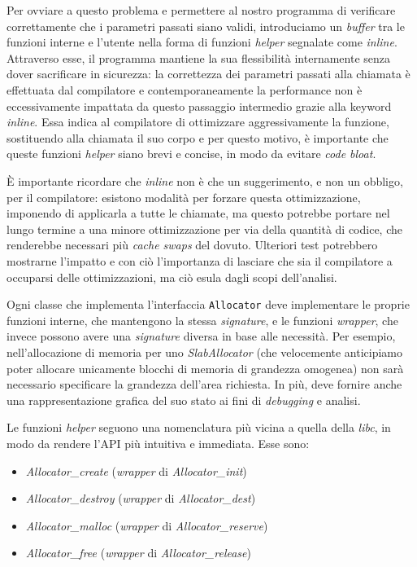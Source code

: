 \documentclass[noexaminfo]{sapthesis}
\begin{document}
Per ovviare a questo problema e permettere al nostro programma di verificare correttamente che i parametri passati siano validi, introduciamo un \textit{buffer} tra le funzioni interne e l’utente nella forma di funzioni \textit{helper} segnalate come \textit{inline}. Attraverso esse, il programma mantiene la sua flessibilità internamente senza dover sacrificare in sicurezza: la correttezza dei parametri passati alla chiamata è effettuata dal compilatore e contemporaneamente la performance non è eccessivamente impattata da questo passaggio intermedio grazie alla keyword \textit{inline}. Essa indica al compilatore di ottimizzare aggressivamente la funzione, sostituendo alla chiamata il suo corpo e per questo motivo, è importante che queste funzioni \textit{helper} siano brevi e concise, in modo da evitare \textit{code bloat}.

È importante ricordare che \textit{inline} non è che un suggerimento, e non un obbligo, per il compilatore: esistono modalità per forzare questa ottimizzazione, imponendo di applicarla a tutte le chiamate, ma questo potrebbe portare nel lungo termine a una minore ottimizzazione per via della quantità di codice, che renderebbe necessari più \textit{cache swaps} del dovuto. Ulteriori test potrebbero mostrarne l’impatto e con ciò l’importanza di lasciare che sia il compilatore a occuparsi delle ottimizzazioni, ma ciò esula dagli scopi dell’analisi.

Ogni classe che implementa l’interfaccia \texttt{Allocator} deve implementare le proprie funzioni interne, che mantengono la stessa \textit{signature}, e le funzioni \textit{wrapper}, che invece possono avere una \textit{signature} diversa in base alle necessità. Per esempio, nell’allocazione di memoria per uno \textit{SlabAllocator} (che velocemente anticipiamo poter allocare unicamente blocchi di memoria di grandezza omogenea) non sarà necessario specificare la grandezza dell’area richiesta. In più, deve fornire anche una rappresentazione grafica del suo stato ai fini di \textit{debugging} e analisi.

Le funzioni \textit{helper} seguono una nomenclatura più vicina a quella della \textit{libc}, in modo da rendere l’API più intuitiva e immediata. Esse sono:
\begin{itemize}
  \item \textit{Allocator\_create} (\textit{wrapper} di \textit{Allocator\_init})
  \item \textit{Allocator\_destroy} (\textit{wrapper} di \textit{Allocator\_dest})
  \item \textit{Allocator\_malloc} (\textit{wrapper} di \textit{Allocator\_reserve})
  \item \textit{Allocator\_free} (\textit{wrapper} di \textit{Allocator\_release})
\end{itemize}
\end{document}
